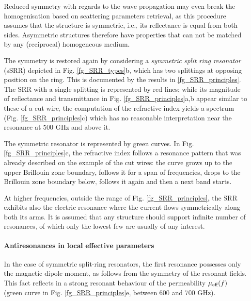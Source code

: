 Reduced symmetry with regards to the wave propagation may even break the homogenisation based on scattering parameters retrieval, as this procedure assumes that the structure is symmetric, i.e., its reflectance is equal from both sides. Asymmetric structures therefore have properties that can not be matched by any (reciprocal) homogeneous medium. 

The symmetry is restored again by considering a \textit{symmetric split ring resonator} (sSRR) depicted in Fig. \ref{fg_SRR_types}b, which has two splittings at opposing position on the ring. 
This is documented by the results in \ref{fg_SRR_principles}. The SRR with a single splitting is represented by red lines; while its magnitude of reflectance and transmittance in Fig. \ref{fg_SRR_principles}a,b appear similar to these of a cut wire, the computation of the refractive index yields a spectrum (Fig. \ref{fg_SRR_principles}c) which has no reasonable interpretation near the resonance at 500 GHz and above it. 

The symmetric resonator is represented by green curves. In Fig. \ref{fg_SRR_principles}c, the refractive index follows a resonance pattern that was already described on the example of the cut wires: the curve grows up to the upper Brillouin zone boundary, follows it for a span of frequencies, drops to the Brillouin zone boundary below, follows it again and then a next band starts. 

At higher frequencies, outside the range of Fig. \ref{fg_SRR_principles}, the SRR exhibits also the electric resonance where the current flows symmetrically along both its arms. It is assumed that any structure should support infinite number of resonances, of which only the lowest few are usually of any interest.
\paragraph{Antiresonances in local effective parameters}%
In the case of symmetric split-ring resonators, the first resonance possesses only the magnetic dipole moment, as follows from the symmetry of the resonant fields. This fact reflects in a strong resonant behaviour of the permeability $\mu_{\text{eff} }(f)$ (green curve in Fig. \ref{fg_SRR_principles}e, between 600 and 700 GHz). 

